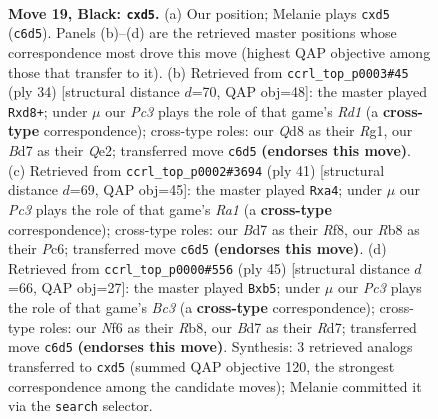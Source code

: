 \documentclass[11pt]{article}
\begin{document}
\clearpage

\begin{figure}[p]\centering
\begin{subfigure}{0.46\textwidth}\centering
\resizebox{\linewidth}{!}{%
\newchessgame
\chessboard[
  setfen={rr1q2k1/p2b1ppp/2p2n2/p2P4/2B4P/1P1Q1NP1/P4P2/R3R1K1 b - - 0 19},
  showmover=false,
  pgfstyle=straightmove, color=movearrow, markmove={c6-d5}
]}
\caption{}
\end{subfigure}\hfill
\begin{subfigure}{0.46\textwidth}\centering
\resizebox{\linewidth}{!}{%
\newchessgame
\chessboard[
  setfen={3rk2r/ppq2pp1/2n1pb1p/2N5/6P1/4B3/PPP1QP1P/1K1R2R1 w k - 2 18},
  showmover=false,
  pgfstyle=straightmove, color=movearrow, markmove={d1-d8}
]}
\caption{}
\end{subfigure}
\\[4pt]
\begin{subfigure}{0.46\textwidth}\centering
\resizebox{\linewidth}{!}{%
\newchessgame
\chessboard[
  setfen={r4r2/2p1q1pk/2pb1n1p/4p3/RP2P3/4BP1P/2QN2P1/1R4K1 b - - 0 21},
  showmover=false,
  pgfstyle=straightmove, color=movearrow, markmove={a8-a4}
]}
\caption{}
\end{subfigure}\hfill
\begin{subfigure}{0.46\textwidth}\centering
\resizebox{\linewidth}{!}{%
\newchessgame
\chessboard[
  setfen={1r1q2k1/3r1ppp/p1bppn2/1P6/4P3/P1NB1P1P/1PR2QP1/3R2K1 b - - 0 23},
  showmover=false,
  pgfstyle=straightmove, color=movearrow, markmove={c6-b5}
]}
\caption{}
\end{subfigure}
\caption{\textbf{Move 19, Black: \texttt{cxd5}.} (a) Our position; Melanie plays \texttt{cxd5} (\texttt{c6d5}). Panels (b)--(d) are the retrieved master positions whose correspondence most drove this move (highest QAP objective among those that transfer to it). (b) Retrieved from \texttt{ccrl\_top\_p0003\#45} (ply 34) [structural distance $d$=70, QAP obj=48]: the master played \texttt{Rxd8+}; under $\mu$ our \emph{Pc3} plays the role of that game's \emph{Rd1} (a \textbf{cross-type} correspondence); cross-type roles: our \emph{Q}d8 as their \emph{R}g1, our \emph{B}d7 as their \emph{Q}e2; transferred move \texttt{c6d5} \textbf{(endorses this move)}. (c) Retrieved from \texttt{ccrl\_top\_p0002\#3694} (ply 41) [structural distance $d$=69, QAP obj=45]: the master played \texttt{Rxa4}; under $\mu$ our \emph{Pc3} plays the role of that game's \emph{Ra1} (a \textbf{cross-type} correspondence); cross-type roles: our \emph{B}d7 as their \emph{R}f8, our \emph{R}b8 as their \emph{P}c6; transferred move \texttt{c6d5} \textbf{(endorses this move)}. (d) Retrieved from \texttt{ccrl\_top\_p0000\#556} (ply 45) [structural distance $d$=66, QAP obj=27]: the master played \texttt{Bxb5}; under $\mu$ our \emph{Pc3} plays the role of that game's \emph{Bc3} (a \textbf{cross-type} correspondence); cross-type roles: our \emph{N}f6 as their \emph{R}b8, our \emph{B}d7 as their \emph{R}d7; transferred move \texttt{c6d5} \textbf{(endorses this move)}. Synthesis: 3 retrieved analogs transferred to \texttt{cxd5} (summed QAP objective 120, the strongest correspondence among the candidate moves); Melanie committed it via the \texttt{search} selector.}
\label{fig:thought-m37}
\end{figure}
\end{document}
